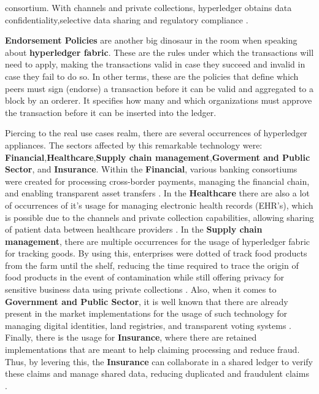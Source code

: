 consortium. With channels and private collections, hyperledger obtains data confidentiality,selective data sharing and regulatory compliance \cite{private-collections}. 

\textbf {Endorsement Policies} are another big dinosaur in the room when speaking about \textbf{hyperledger fabric}. These are the rules under which the transactions will need to apply, making the transactions valid in case they succeed and invalid in case they fail to do so. In other terms, these are the policies that define which peers must sign (endorse) a transaction before it can be valid and aggregated to a block by an orderer. It specifies how many and which organizations must approve the transaction before it can be inserted into the ledger.

Piercing to the real use cases realm, there are several occurrences of hyperledger appliances. The sectors affected by this remarkable technology were: \textbf{Financial},\textbf{Healthcare},\textbf{Supply chain management},\textbf{Goverment and Public Sector}, and \textbf{Insurance}. Within the \textbf{Financial}, various banking consortiums were created for processing cross-border payments, managing the financial chain, and enabling transparent asset transfers \cite{finances-use-case}. In the \textbf{Healthcare} there are also a lot of occurrences of it's usage for managing electronic health records (EHR's), which is possible due to the channels and private collection capabilities, allowing sharing of patient data between healthcare providers \cite{healthcare-use-case}. In the \textbf{Supply chain management}, there are multiple occurrences for the usage of hyperledger fabric for tracking goods. By using this, enterprises were dotted of track food products from the farm until the shelf, reducing the time required to trace the origin of food products in the event of contamination while still offering privacy for sensitive business data using private collections \cite{supply-chain-use-case}. Also, when it comes to \textbf{Government and Public Sector}, it is well known that there are already present in the market implementations for the usage of such technology for managing digital identities, land registries, and transparent voting systems \cite{public-sector-use-case}. Finally, there is the usage for \textbf{Insurance}, where there are retained implementations that are meant to help claiming processing and reduce fraud. Thus, by levering this, the \textbf{Insurance} can collaborate in a shared ledger to verify these claims and manage shared data, reducing duplicated and fraudulent claims \cite{insurance-use-case}.

